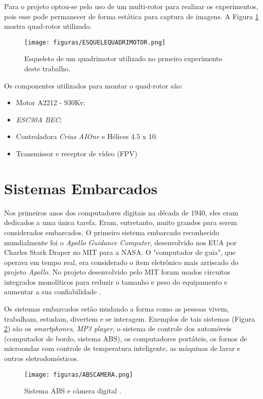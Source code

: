Para o projeto optou-se pelo uso de um multi-rotor para realizar os experimentos, pois esse pode permanecer de forma estática para captura de imagens. A Figura \ref{ESQUELEQUADRIMOTOR} mostra quad-rotor utilizado.

\begin{figure}
	\centering
	\texttt{[image: figuras/ESQUELEQUADRIMOTOR.png]}
    \caption{Esqueleto de um quadrimotor utilizado no prmeiro experimento deste trabalho.}
    \label{ESQUELEQUADRIMOTOR}
\end{figure}

Os componentes utilizados para montar o quad-rotor são:

\begin{itemize}
\item Motor A2212 - 930Kv;
\item \textit{ESC30A BEC}; 
\item Controladora \textit{Crius AIOne} e Hélices 4.5 x 10. 
\item Transmissor e receptor de vídeo (FPV)

\end{itemize}

\section{Sistemas Embarcados}
Nos primeiros anos dos computadores digitais na década de 1940, eles eram dedicados a uma única tarefa. Eram, entretanto, muito grandes para serem considerados embarcados. O primeiro sistema embarcado reconhecido mundialmente foi o \textit{Apollo Guidance Computer}, desenvolvido nos EUA por Charles Stark Draper no MIT para a NASA. O "computador de guia", que operava em tempo real, era considerado o item eletrônico mais arriscado do projeto \textit{Apollo}. No projeto desenvolvido pelo MIT foram usados circuitos integrados monolíticos para reduzir o tamanho e peso do equipamento e aumentar a sua confiabilidade .

Os sistemas embarcados estão mudando a forma como as pessoas vivem, trabalham, estudam, divertem e se interagem. Exemplos de tais sistemas (Figura \ref{ABSCAMERA}) são os \textit{smartphones}, \textit{MP3 player}, o sistema de controle dos automóveis (computador de bordo, sistema ABS), os computadores portáteis, os fornos de microondas com controle de temperatura inteligente, as máquinas de lavar e outros eletrodomésticos.

\begin{figure}
	\centering
	\texttt{[image: figuras/ABSCAMERA.png]}
    \caption{Sistema ABS e câmera digital .}
    \label{ABSCAMERA}
\end{figure}

